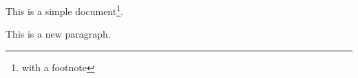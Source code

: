 \documentclass[a4paper,12pt]{article}
\begin{document}
This is   a simple
document\footnote{with a footnote}.

This is a new paragraph.
\end{document}

